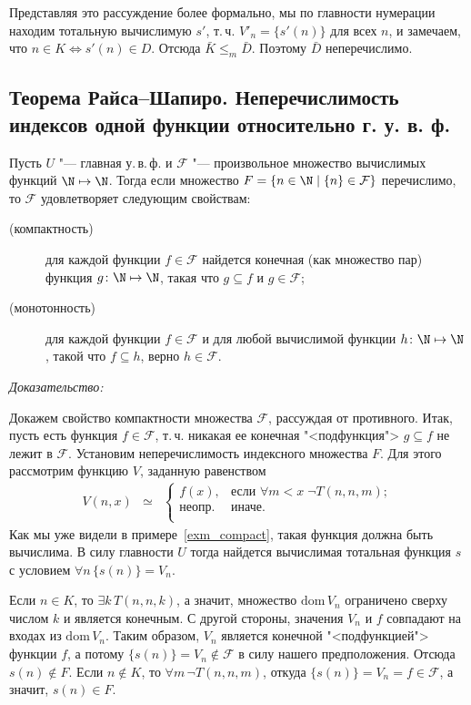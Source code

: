 \documentclass[a4paper, 10pt]{article}
\newcommand{\dom}{\text{dom}\,}
\begin{document}
Представляя это рассуждение более формально, мы по главности нумерации находим тотальную вычислимую $s'$, т.\,ч. $V'_n = \{s'(n)\}$ для всех $n$, и замечаем, что $n \in K \iff s'(n) \in D$. Отсюда $\bar K \leq_m \bar D$. Поэтому $\bar D$ неперечислимо.




\subsection{Теорема Райса–Шапиро. Неперечислимость индексов одной функции относительно г. у. в. ф.}
Пусть $U$ "--- главная у.\,в.\,ф. и $\mathcal F$ "--- произвольное множество вычислимых функций $\N \mapsto \N$. Тогда если множество $F = \{n \in \N \mid \{n\} \in \mathcal F \}$ перечислимо, то $\mathcal F$ удовлетворяет следующим свойствам:
\begin{description}
\item[(компактность)] для каждой функции $f \in \mathcal F$ найдется конечная (как множество пар) функция $g\colon \N \mapsto \N$, такая что $g \subseteq f$ и $g \in \mathcal F$;
\item[(монотонность)] для каждой функции $f \in \mathcal F$ и для любой вычислимой функции $h\colon \N \mapsto \N$, такой что $f \subseteq h$, верно $h \in \mathcal F$.
\end{description}

\textit{Доказательство:}

Докажем свойство компактности множества $\mathcal F$, рассуждая от противного. Итак, пусть есть функция $f \in \mathcal F$, т.\,ч. никакая ее конечная "<подфункция"> $g \subseteq f$ не лежит в $\mathcal F$. Установим неперечислимость индексного множества $F$. Для этого рассмотрим функцию $V$, заданную равенством
$$\begin{array}{rcl}
V(n, x)&\simeq&\begin{cases}
                  f(x),&\text{если }\forall m < x\; \neg T(n, n, m);\\
		 \mbox{неопр.}&\text{иначе}.\\
		  \end{cases}
\end{array}$$
Как мы уже видели в примере~\ref{exm_compact}, такая функция должна быть вычислима. В силу главности $U$ тогда найдется вычислимая тотальная функция $s$ с условием $\forall n\, \{s(n)\} = V_n$.

Если $n \in K$, то $\exists k\, T(n,n,k)$, а значит, множество $\dom V_n$ ограничено сверху числом $k$ и является конечным. С другой стороны, значения $V_n$ и $f$ совпадают на входах из $\dom V_n$. Таким образом, $V_n$ является конечной "<подфункцией"> функции $f$, а потому $\{s(n)\} = V_n \notin \mathcal F$ в силу нашего предположения. Отсюда $s(n) \notin F$. Если $n \notin K$, то $\forall m\, \neg T(n,n,m)$, откуда $\{s(n)\} = V_n = f \in \mathcal F$, а значит, $s(n) \in F$.
\end{document}
